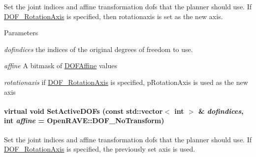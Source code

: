 Set the joint indices and affine transformation dofs that the planner should use. If \hyperlink{namespaceOpenRAVE_a3016e2185103f3c1bdc5e4482893ca98a5ee6baa8acb92c310cbc1ece082640d0}{DOF\_\-RotationAxis} is specified, then rotationaxis is set as the new axis. 


\begin{DoxyParams}{Parameters}
\item[{\em dofindices}]the indices of the original degrees of freedom to use. \item[{\em affine}]A bitmask of \hyperlink{namespaceOpenRAVE_a3016e2185103f3c1bdc5e4482893ca98}{DOFAffine} values \item[{\em rotationaxis}]if \hyperlink{namespaceOpenRAVE_a3016e2185103f3c1bdc5e4482893ca98a5ee6baa8acb92c310cbc1ece082640d0}{DOF\_\-RotationAxis} is specified, pRotationAxis is used as the new axis \end{DoxyParams}
\hypertarget{classOpenRAVE_1_1RobotBase_a36a3474433e5ec3ab832a28f8fe8651b}{
\paragraph[{SetActiveDOFs}]{\setlength{\rightskip}{0pt plus 5cm}virtual void SetActiveDOFs (const std::vector$<$ int $>$ \& {\em dofindices}, \/  int {\em affine} = {\ttfamily OpenRAVE::DOF\_\-NoTransform})}\hfill}
\label{classOpenRAVE_1_1RobotBase_a36a3474433e5ec3ab832a28f8fe8651b}


Set the joint indices and affine transformation dofs that the planner should use. If \hyperlink{namespaceOpenRAVE_a3016e2185103f3c1bdc5e4482893ca98a5ee6baa8acb92c310cbc1ece082640d0}{DOF\_\-RotationAxis} is specified, the previously set axis is used. 


